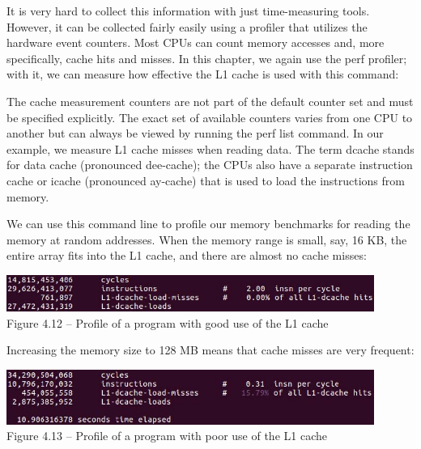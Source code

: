 It is very hard to collect this information with just time-measuring tools. However, it can be collected fairly easily using a profiler that utilizes the hardware event counters. Most CPUs can count memory accesses and, more specifically, cache hits and misses. In this chapter, we again use the perf profiler; with it, we can measure how effective the L1 cache is used with this command:


The cache measurement counters are not part of the default counter set and must be specified explicitly. The exact set of available counters varies from one CPU to another but can always be viewed by running the perf list command. In our example, we measure L1 cache misses when reading data. The term dcache stands for data cache (pronounced dee-cache); the CPUs also have a separate instruction cache or icache (pronounced ay-cache) that is used to load the instructions from memory.

We can use this command line to profile our memory benchmarks for reading the memory at random addresses. When the memory range is small, say, 16 KB, the entire array fits into the L1 cache, and there are almost no cache misses:

\begin{center}
\includegraphics[width=0.9\textwidth]{content/1/chapter4/images/12.jpg}\\
Figure 4.12 – Profile of a program with good use of the L1 cache
\end{center}

Increasing the memory size to 128 MB means that cache misses are very frequent:

\begin{center}
\includegraphics[width=0.9\textwidth]{content/1/chapter4/images/13.jpg}\\
Figure 4.13 – Profile of a program with poor use of the L1 cache
\end{center}

